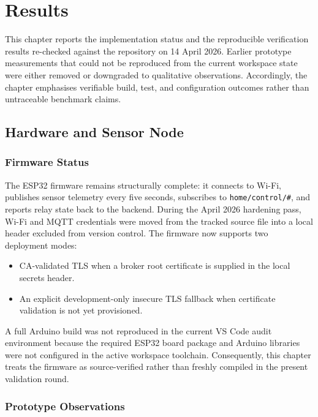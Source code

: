 \chapter{Results}

This chapter reports the implementation status and the reproducible verification
results re-checked against the repository on 14 April 2026. Earlier prototype
measurements that could not be reproduced from the current workspace state were
either removed or downgraded to qualitative observations. Accordingly, the chapter
emphasises verifiable build, test, and configuration outcomes rather than
untraceable benchmark claims.

\section{Hardware and Sensor Node}

\subsection{Firmware Status}

The ESP32 firmware remains structurally complete: it connects to Wi-Fi, publishes
sensor telemetry every five seconds, subscribes to \texttt{home/control/\#}, and
reports relay state back to the backend. During the April 2026 hardening pass,
Wi-Fi and MQTT credentials were moved from the tracked source file into a local
header excluded from version control. The firmware now supports two deployment
modes:

\begin{itemize}
    \item CA-validated TLS when a broker root certificate is supplied in the local secrets header.
    \item An explicit development-only insecure TLS fallback when certificate validation is not yet provisioned.
\end{itemize}

A full Arduino build was not reproduced in the current VS Code audit environment because the required ESP32 board package and Arduino libraries were not configured in the active workspace toolchain. Consequently, this chapter treats the firmware as source-verified rather than freshly compiled in the present validation round.

\subsection{Prototype Observations}

